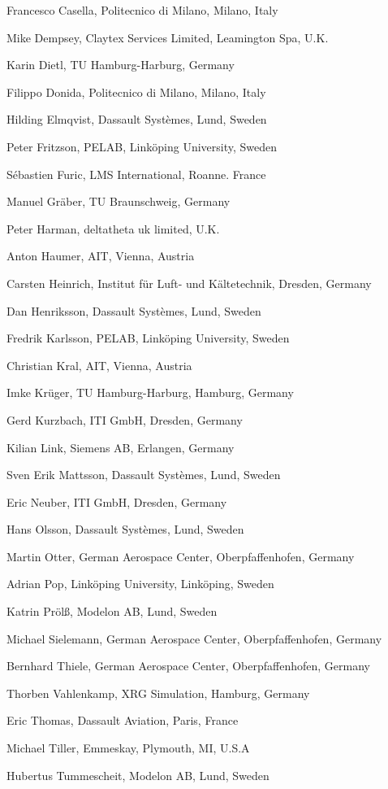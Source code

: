 Francesco Casella, Politecnico di Milano, Milano, Italy

Mike Dempsey, Claytex Services Limited, Leamington Spa, U.K.

Karin Dietl, TU Hamburg-Harburg, Germany

Filippo Donida, Politecnico di Milano, Milano, Italy

Hilding Elmqvist, Dassault Systèmes, Lund, Sweden

Peter Fritzson, PELAB, Linköping University, Sweden

Sébastien Furic, LMS International, Roanne. France

Manuel Gräber, TU Braunschweig, Germany

Peter Harman, deltatheta uk limited, U.K.

Anton Haumer, AIT, Vienna, Austria

Carsten Heinrich, Institut für Luft- und Kältetechnik, Dresden, Germany

Dan Henriksson, Dassault Systèmes, Lund, Sweden

Fredrik Karlsson, PELAB, Linköping University, Sweden

Christian Kral, AIT, Vienna, Austria

Imke Krüger, TU Hamburg-Harburg, Hamburg, Germany

Gerd Kurzbach, ITI GmbH, Dresden, Germany

Kilian Link, Siemens AB, Erlangen, Germany

Sven Erik Mattsson, Dassault Systèmes, Lund, Sweden

Eric Neuber, ITI GmbH, Dresden, Germany

Hans Olsson, Dassault Systèmes, Lund, Sweden

Martin Otter, German Aerospace Center, Oberpfaffenhofen, Germany

Adrian Pop, Linköping University, Linköping, Sweden

Katrin Prölß, Modelon AB, Lund, Sweden

Michael Sielemann, German Aerospace Center, Oberpfaffenhofen, Germany

Bernhard Thiele, German Aerospace Center, Oberpfaffenhofen, Germany

Thorben Vahlenkamp, XRG Simulation, Hamburg, Germany

Eric Thomas, Dassault Aviation, Paris, France

Michael Tiller, Emmeskay, Plymouth, MI, U.S.A

Hubertus Tummescheit, Modelon AB, Lund, Sweden

